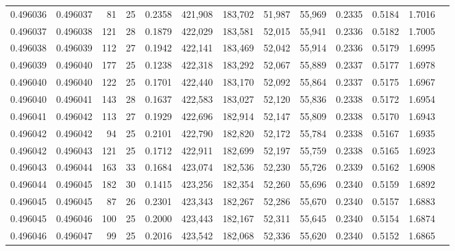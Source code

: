 \begin{tabular}{rrrrrrrrrrrrr}
0.496036 & 0.496037 &  81 &  25 &                                     0.2358 & 421,908 & 183,702 &  51,987 &  55,969 & 0.2335 & 0.5184 & 1.7016 \\
0.496037 & 0.496038 & 121 &  28 &                                     0.1879 & 422,029 & 183,581 &  52,015 &  55,941 & 0.2336 & 0.5182 & 1.7005 \\
0.496038 & 0.496039 & 112 &  27 &                                     0.1942 & 422,141 & 183,469 &  52,042 &  55,914 & 0.2336 & 0.5179 & 1.6995 \\
0.496039 & 0.496040 & 177 &  25 &                                     0.1238 & 422,318 & 183,292 &  52,067 &  55,889 & 0.2337 & 0.5177 & 1.6978 \\
0.496040 & 0.496040 & 122 &  25 &                                     0.1701 & 422,440 & 183,170 &  52,092 &  55,864 & 0.2337 & 0.5175 & 1.6967 \\
0.496040 & 0.496041 & 143 &  28 &                                     0.1637 & 422,583 & 183,027 &  52,120 &  55,836 & 0.2338 & 0.5172 & 1.6954 \\
0.496041 & 0.496042 & 113 &  27 &                                     0.1929 & 422,696 & 182,914 &  52,147 &  55,809 & 0.2338 & 0.5170 & 1.6943 \\
0.496042 & 0.496042 &  94 &  25 &                                     0.2101 & 422,790 & 182,820 &  52,172 &  55,784 & 0.2338 & 0.5167 & 1.6935 \\
0.496042 & 0.496043 & 121 &  25 &                                     0.1712 & 422,911 & 182,699 &  52,197 &  55,759 & 0.2338 & 0.5165 & 1.6923 \\
0.496043 & 0.496044 & 163 &  33 &                                     0.1684 & 423,074 & 182,536 &  52,230 &  55,726 & 0.2339 & 0.5162 & 1.6908 \\
0.496044 & 0.496045 & 182 &  30 &                                     0.1415 & 423,256 & 182,354 &  52,260 &  55,696 & 0.2340 & 0.5159 & 1.6892 \\
0.496045 & 0.496045 &  87 &  26 &                                     0.2301 & 423,343 & 182,267 &  52,286 &  55,670 & 0.2340 & 0.5157 & 1.6883 \\
0.496045 & 0.496046 & 100 &  25 &                                     0.2000 & 423,443 & 182,167 &  52,311 &  55,645 & 0.2340 & 0.5154 & 1.6874 \\
0.496046 & 0.496047 &  99 &  25 &                                     0.2016 & 423,542 & 182,068 &  52,336 &  55,620 & 0.2340 & 0.5152 & 1.6865 \\

\end{tabular}
